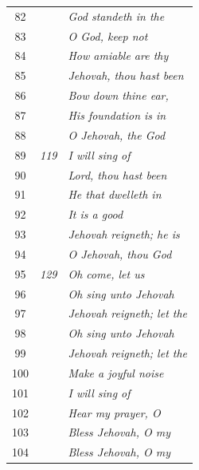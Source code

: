 \documentclass{article}
\newlength{\minipageheight}
\newlength{\minipagewidth}
\begin{document}
\begin{minipage}[r][\minipageheight][t]{\minipagewidth}
\begin{longtable}{ccl}
        82          &              & \textit{God standeth in the}          \\
        83          &              & \textit{O God, keep not}              \\
        84          &              & \textit{How amiable are thy}          \\
        85          &              & \textit{Jehovah, thou hast been}      \\
        86          &              & \textit{Bow down thine ear,}          \\
        87          &              & \textit{His foundation is in}         \\
        88          &              & \textit{O Jehovah, the God}           \\
        89          & \textit{119} & \textit{I will sing of}               \\
        90          &              & \textit{Lord, thou hast been}         \\
        91          &              & \textit{He that dwelleth in}          \\
        92          &              & \textit{It is a good}                 \\
        93          &              & \textit{Jehovah reigneth; he is}      \\
        94          &              & \textit{O Jehovah, thou God}          \\
        95          & \textit{129} & \textit{Oh come, let us}              \\
        96          &              & \textit{Oh sing unto Jehovah}         \\
        97          &              & \textit{Jehovah reigneth; let the}    \\
        98          &              & \textit{Oh sing unto Jehovah}         \\
        99          &              & \textit{Jehovah reigneth; let the}    \\
        100         &              & \textit{Make a joyful noise}          \\
        101         &              & \textit{I will sing of}               \\
        102         &              & \textit{Hear my prayer, O}            \\
        103         &              & \textit{Bless Jehovah, O my}          \\
        104         &              & \textit{Bless Jehovah, O my}          \\

\end{longtable}
\end{minipage}
\end{document}
